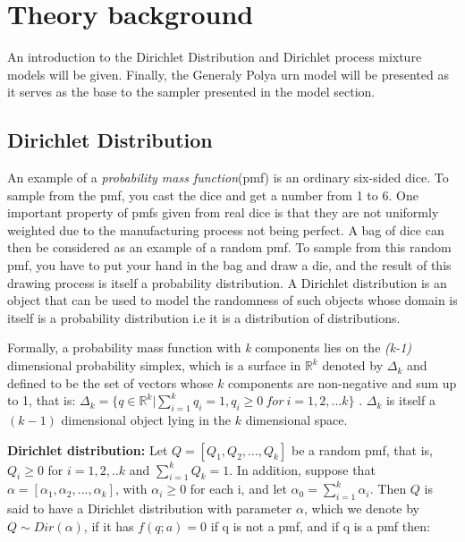 \documentclass[twoside,hidelinks]{article}
\begin{document}

\newpage
\section{Theory background}
\label{sec:theory}


An introduction to the Dirichlet Distribution and Dirichlet process mixture models will be given. Finally, the Generaly Polya urn model will be presented as it serves as the base to the sampler presented in the model section.

\subsection{Dirichlet Distribution}

An example of a \textit{probability mass function}(pmf) is an ordinary six-sided dice. To sample from the pmf, you cast the dice and get a number from 1 to 6. One important property of pmfs given from real dice is that they are not uniformly weighted due to the manufacturing process not being perfect. A bag of dice can then be considered as an example of a random pmf. To sample from this random pmf, you have to put your hand in the bag and draw a die, and the result of this drawing process is itself a probability distribution. A Dirichlet distribution is an object that can be used to model the randomness of such objects whose domain is itself is a probability distribution i.e it is a distribution of distributions.

Formally, a probability mass function with \textit{k} components lies on the \textit{(k-1)} dimensional probability simplex, which is a surface in $ \mathbb{R}^k $ denoted by $ \Delta_k $ and defined to be the set of vectors whose $ k $  components are non-negative and sum up to 1, that is:  $ \Delta_k = \{ q \in  \mathbb{R}^k | \sum_{i=1}^k q_i=1, q_i \geq 0\ for\ i=1,2,...k \} $ . $ \Delta_k $  is itself a $ ( k-1 ) $ dimensional object lying in the $k$ dimensional space. 

\textbf{Dirichlet distribution:} Let $ Q = [Q_1,Q_2,...,Q_k  ] $ be a random pmf, that is, $ Q_i \geq 0 $ for $ i=1,2,..k $ and $ \sum_{i=1}^k Q_k=1 $. In addition, suppose that $ \alpha = [\alpha_1, \alpha_2, ..., \alpha_k ] $, with $ \alpha_i  \ge  0 $ for each i, and let $ \alpha_0 = \sum_{i=1}^k \alpha_i $. Then $ Q $ is said to have a Dirichlet distribution with parameter $\alpha$, which we denote by $ Q \sim  Dir(\alpha)$, if it has $f(q;a) = 0$ if q is not a pmf, and if q is a pmf then:
\end{document}
